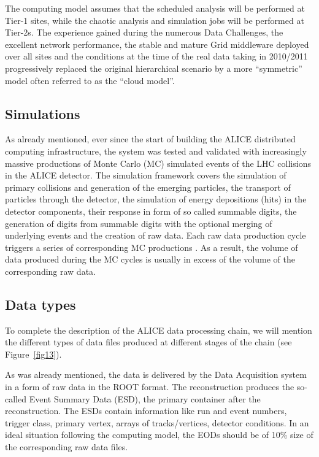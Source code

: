 The computing model assumes that the scheduled analysis will be
performed at Tier-1 sites, while the chaotic analysis and simulation
jobs will be performed at Tier-2s. The experience gained during the
numerous Data Challenges, the excellent network performance, the
stable and mature Grid middleware deployed over all sites and the
conditions at the time of the real data taking in 2010/2011
progressively replaced the original hierarchical scenario by a more
``symmetric'' model often referred to as the ``cloud model''.

\subsection{Simulations}
%
As already mentioned, ever since the start of building the ALICE
distributed computing infrastructure, the system was tested and
validated with increasingly massive productions  of Monte Carlo (MC)
simulated events of the LHC collisions in the ALICE detector. The
simulation framework \cite{simulation} covers the simulation of primary collisions
and generation of the emerging particles, the transport of particles
through the detector, the simulation of energy depositions (hits) in
the detector components, their response in form of so called
summable digits, the generation of digits from summable digits with
the optional merging of underlying events and the creation of raw
data. Each raw data production cycle triggers a series of
corresponding MC productions \cite{mc}. As a result, the volume of
data produced during the MC cycles is usually in excess of the
volume of the corresponding raw data.

\subsection{Data types}
%
To complete the description of the ALICE data processing chain, we
will mention the different types of data files produced at different
stages of the chain (see Figure~\ref{fig13}).

As was already mentioned, the data is delivered by the Data
Acquisition system in a form of raw data in the ROOT format. The
reconstruction produces the so-called Event Summary Data (ESD), the
primary container after the reconstruction. The ESDs contain
information like run and event numbers, trigger class, primary
vertex, arrays of tracks/vertices, detector conditions. In an ideal
situation following the computing model, the EODs should be of 10\%
size of the corresponding raw data files.

